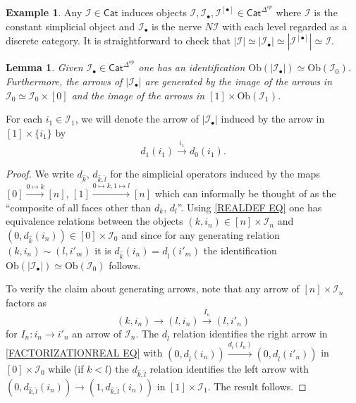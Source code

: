 \documentclass[a4paper,10pt
,draft
]{article}%
\numberwithin{equation}{section}
\numberwithin{figure}{section}
\newtheorem{lemma}[equation]{Lemma}%
\theoremstyle{definition} %
\newtheorem{example}[equation]{Example}%
\newcommand{\1}{\ensuremath{\mathbbm 1}}%
\begin{document}
\begin{example}
Any $\mathcal{I} \in \mathsf{Cat}$ induces objects 
$\mathcal{I},\mathcal{I}_{\bullet},\mathcal{I}^{[\bullet]} \in \mathsf{Cat}^{\Delta^{op}}$ 
where $\mathcal{I}$ is the constant simplicial object and $\mathcal{I}_{\bullet}$ is the nerve $N \mathcal{I}$ with each level regarded as a discrete category.
It is straightforward to check that 
$|\mathcal{I}|\simeq |\mathcal{I}_{\bullet}| \simeq
|\mathcal{I}^{[\bullet]}| \simeq \mathcal{I}$.
\end{example}


\begin{lemma}\label{OBJGENREL LEMMA}
	Given $\mathcal{I}_{\bullet} \in \mathsf{Cat}^{\Delta^{op}}$ one has an identification
	$\text{Ob}(|\mathcal{I}_{\bullet}|) \simeq \text{Ob}(\mathcal{I}_0)$.
	Furthermore, the arrows of $|\mathcal{I}_{\bullet}|$ are generated by the image of the arrows in $\mathcal{I}_0 \simeq \mathcal{I}_0 \times [0]$ and the image of the arrows in 
	$[1] \times \text{Ob}(\mathcal{I}_1)$.
\end{lemma}

For each $i_1 \in \mathcal{I}_1$, we will denote the arrow of 
$|\mathcal{I}_{\bullet}|$ induced by the arrow in $[1] \times \{i_1\}$ by
\[d_1(i_1) \xrightarrow{i_1} d_0(i_1).\]


\begin{proof}
	We write $d_{\hat{k}}$, $d_{\hat{k},\hat{l}}$ for the simplicial operators induced by the maps 
	$[0]\xrightarrow{0 \mapsto k} [n]$,
	$[1]\xrightarrow{0 \mapsto k,1 \mapsto l} [n]$
	which can informally be thought of as the ``composite of all faces other than $d_k$, $d_l$''.
Using \eqref{REALDEF EQ} one has equivalence relations
between the objects  
$(k,i_n) \in [n] \times \mathcal{I}_n$
and 
$(0,d_{\hat{k}}(i_n))
\in [0] \times \mathcal{I}_0$
and since for any generating relation $(k,i_n)\sim (l,i'_m)$
it is $d_{\hat{k}}(i_n) = d_{\hat{l}}(i'_m)$ the identification 
$\text{Ob}(|\mathcal{I}_{\bullet}|) \simeq \text{Ob}(\mathcal{I}_0)$
follows.


To verify the claim about generating arrows, note that any arrow of $[n]\times \mathcal{I}_n$ factors as 
\begin{equation}\label{FACTORIZATIONREAL EQ}
(k,i_n) \to (l,i_n)  \xrightarrow{I_n} (l,i'_n)
\end{equation}
for $I_n \colon i_n \to i'_n$
an arrow of $\mathcal{I}_n$. 
The $d_{\hat{l}}$ relation identifies the right arrow in 
\eqref{FACTORIZATIONREAL EQ}
with
$(0,d_{\hat{l}}(i_n))
	\xrightarrow{d_{\hat{l}}(I_n)}
(0,d_{\hat{l}}(i'_n))
$
in $[0]\times \mathcal{I}_0$
while (if $k<l$) the $d_{\hat{k},\hat{l}}$ relation identifies the left arrow with 
$(0,d_{\hat{k},\hat{l}}(i_n)) \to (1,d_{\hat{k},\hat{l}}(i_n))$
in $[1]\times \mathcal{I}_1$. The result follows.
\end{proof}
\end{document}
